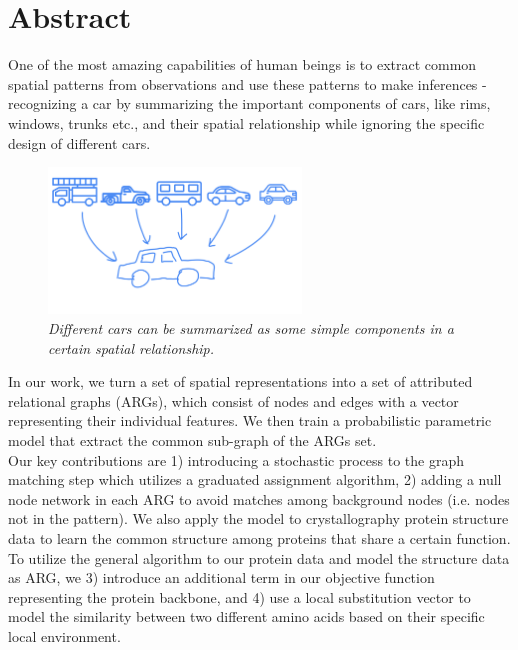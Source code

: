 \chapter*{Abstract}

One of the most amazing capabilities of human beings is to extract common spatial patterns from observations and use these patterns to make inferences - recognizing a car by summarizing the important components of cars, like rims, windows, trunks etc., and their spatial relationship while ignoring the specific design of different cars. 

\begin{figure}[h]
	\centering
	\captionsetup{justification=centering}
	\includegraphics[width=0.6\textwidth]{figs/car_summary.png}
	\caption[Caption for LOF]{\emph{Different cars can be summarized as some simple components in a certain spatial relationship.\footnotemark}}
	\label{fig:car_summary}
\end{figure}

In our work, we turn a set of spatial representations into a set of attributed relational graphs (ARGs), which consist of nodes and edges with a vector representing their individual features. We then train a probabilistic parametric model that extract the common sub-graph of the ARGs set.\\

Our key contributions are 1) introducing a stochastic process to the graph matching step which utilizes a graduated assignment algorithm, 2) adding a null node network in each ARG to avoid matches among background nodes (i.e. nodes not in the pattern). We also apply the model to crystallography protein structure data to learn the common structure among proteins that share a certain function. To utilize the general algorithm to our protein data and model the structure data as ARG, we 3) introduce an additional term in our objective function representing the protein backbone, and 4) use a local substitution vector to model the similarity between two different amino acids based on their specific local environment.\\

